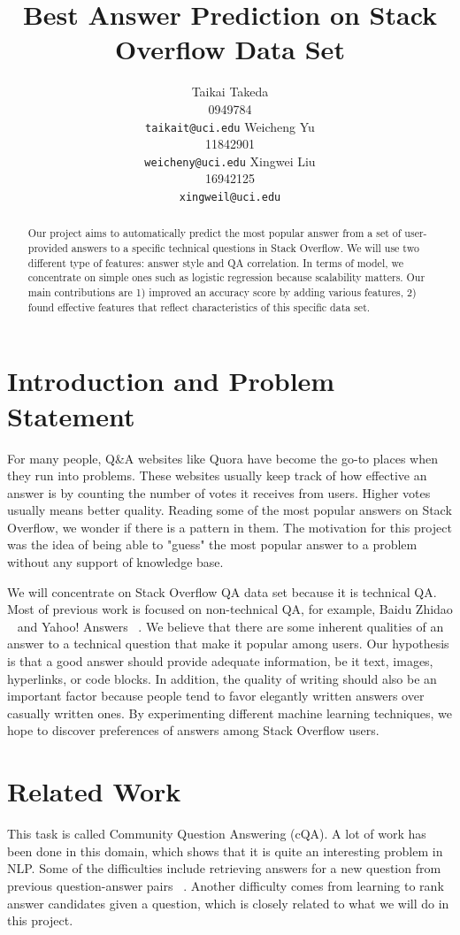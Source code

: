 \documentclass[11pt]{article}
\title{Best Answer Prediction on Stack Overflow Data Set}
\author{Taikai Takeda\\
		0949784 \\
	    {\tt taikait@uci.edu}
	  \And
	Weicheng Yu\\
    11842901 \\
  {\tt weicheny@uci.edu}
  \And 
  Xingwei Liu \\
  16942125 \\
  {\tt xingweil@uci.edu}
  }
\date{}
\begin{document}
\maketitle

\begin{abstract}
Our project aims to automatically predict the most popular answer from a set of user-provided answers to a specific technical questions in Stack Overflow. We will use two different type of features: answer style and QA correlation. In terms of model, we concentrate on simple ones such as logistic regression because scalability matters. Our main contributions are 1) improved an accuracy score by adding various features, 2) found effective features that reflect characteristics of this specific data set.
\end{abstract}

\section{Introduction and Problem Statement}
For many people, Q\&A websites like Quora have become the go-to places when they run into problems. These websites usually keep track of how effective an answer is by counting the number of votes it receives from users. Higher votes usually means better quality. Reading some of the most popular answers on Stack Overflow, we wonder if there is a pattern in them. The motivation for this project was the idea of being able to "guess" the most popular answer to a problem without any support of knowledge base.

We will concentrate on Stack Overflow QA data set because it is technical QA. Most of previous work is focused on non-technical QA, for example, Baidu Zhidao ~\cite{Wang2010} and Yahoo! Answers ~\cite{Surdeanu2011,Qiu2015}. We believe that there are some inherent qualities of an answer to a technical question that make it popular among users. Our hypothesis is that a good answer should provide adequate information, be it text, images, hyperlinks, or code blocks. In addition, the quality of writing should also be an important factor because people tend to favor elegantly written answers over casually written ones. By experimenting different machine learning techniques, we hope to discover preferences of answers among Stack Overflow users.

\section{Related Work}
This task is called Community Question Answering (cQA). A lot of work has been done in this domain, which shows that it is quite an interesting problem in NLP. Some of the difficulties include retrieving answers for a new question from previous question-answer pairs ~\cite{Zhou2016}. Another difficulty comes from learning to rank answer candidates given a question, which is closely related to what we will do in this project.
\end{document}
